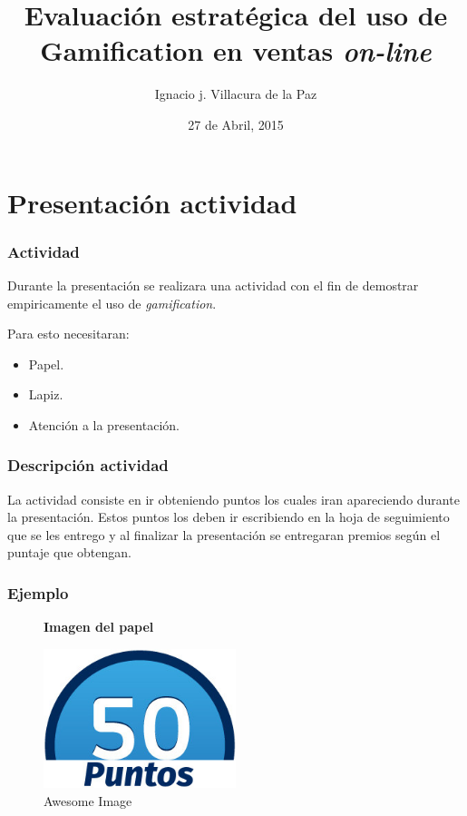 \documentclass[10pt, compress]{beamer}
\title{Evaluación estratégica del uso de Gamification en ventas \emph{on-line}}
\subtitle{}
\date{27 de Abril, 2015}
\author{Ignacio j. Villacura de la Paz}
\institute{Departamento de Informática\\ Universidad Técnica Federico Santa Maria}
\begin{document}
\maketitle

\section{Presentación actividad}

\begin{frame}[fragile]
  \frametitle{Actividad}
Durante la presentación se realizara una actividad con el fin de demostrar empiricamente 
el uso de \emph{gamification}.

Para esto necesitaran:

\begin{itemize}[<+- | alert@+>]
\item Papel.
\item Lapiz.
\item Atención a la presentación.
\end{itemize}

\end{frame}

\begin{frame}[fragile]
  \frametitle{Descripción actividad}

La actividad consiste en ir obteniendo puntos los cuales iran apareciendo durante la presentación.
Estos puntos los deben ir escribiendo en la hoja de seguimiento que se les entrego y al finalizar la presentación
se entregaran premios según el puntaje que obtengan.

\end{frame}

\begin{frame}[fragile]
  \frametitle{Ejemplo}
\begin{figure}

\textbf{Imagen del papel}

\centering
    \includegraphics[width=0.5\textwidth]{images/50-points.jpg}
    \caption{Awesome Image}
    \label{fig:awesome_image}
\end{figure}
\end{frame}
\end{document}
